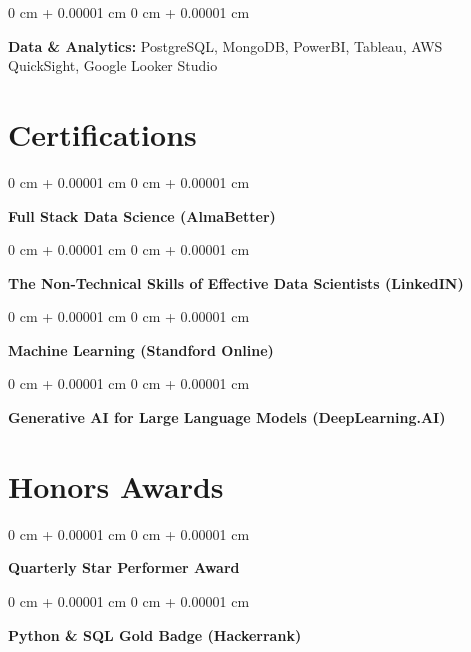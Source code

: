 \documentclass[10pt, letterpaper]{article}
\newenvironment{onecolentry}{
    \begin{adjustwidth}{
        0 cm + 0.00001 cm
    }{
        0 cm + 0.00001 cm
    }
}{
    \end{adjustwidth}
} %
\newenvironment{twocolentry}[2][]{
    \onecolentry
    \def\secondColumn{#2}
    \setcolumnwidth{\fill, 4.2 cm}
    \begin{paracol}{2}
}{
    \switchcolumn \raggedleft \secondColumn
    \end{paracol}
    \endonecolentry
} %
\begin{document}
        \begin{onecolentry}
            \textbf{Data \& Analytics:} PostgreSQL, MongoDB, PowerBI, Tableau, AWS QuickSight, Google Looker Studio
        \end{onecolentry}


    
    \section{Certifications}



        
        \begin{onecolentry}
            \textbf{Full Stack Data Science (AlmaBetter)}\end{onecolentry}



        \vspace{0.15 cm}

        \begin{onecolentry}
            \textbf{The Non-Technical Skills of Effective Data Scientists (LinkedIN)}\end{onecolentry}



        \vspace{0.15 cm}

        \begin{onecolentry}
            \textbf{Machine Learning (Standford Online)}\end{onecolentry}



        \vspace{0.15 cm}

        \begin{onecolentry}
            \textbf{Generative AI for Large Language Models (DeepLearning.AI)}\end{onecolentry}




    
    \section{Honors Awards}



        
        \begin{twocolentry}{
            2024
        }
            \textbf{Quarterly Star Performer Award}\end{twocolentry}



        \vspace{0.15 cm}

        \begin{onecolentry}
            \textbf{Python \& SQL Gold Badge (Hackerrank)}\end{onecolentry}




    
\end{document}
